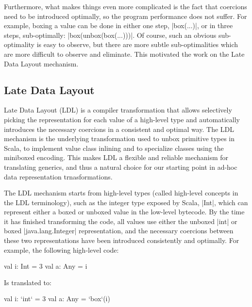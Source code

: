Furthermore, what makes things even more complicated is the fact that coercions need to be introduced optimally, so the program performance does not suffer. For example, boxing a value can be done in either one step, |box(...)|, or in three steps, sub-optimally: |box(unbox(box(...)))|. Of course, such an obvious sub-optimality is easy to observe, but there are more subtle sub-optimalities which are more difficult to observe and eliminate. This motivated the work on the Late Data Layout mechanism.

\subsection {Late Data Layout}

Late Data Layout (LDL) is a compiler transformation that allows selectively picking the representation for each value of a high-level type and automatically introduces the necessary coercions in a consistent and optimal way. The LDL mechanism is the underlying transformation used to unbox primitive types in Scala, to implement value class inlining and to specialize classes using the miniboxed encoding. This makes LDL a flexible and reliable mechanism for translating generics, and thus a natural choice for our starting point in ad-hoc data representation trnasformations.

The LDL mechanism starts from high-level types (called high-level concepts in the LDL terminology), such as the integer type exposed by Scala, |Int|, which can represent either a boxed or unboxed value in the low-level bytecode. By the time it has finished transforming the code, all values use either the unboxed |int| or boxed |java.lang.Integer| representation, and the necessary coercions between these two representations have been introduced consistently and optimally. For example, the following high-level code:

\begin{lstlisting-nobreak}
val i: Int = 3
val a: Any = i
\end{lstlisting-nobreak}

Is translated to:

\begin{lstlisting-nobreak}
val i: `int` = 3
val a: Any = `box`(i)
\end{lstlisting-nobreak}

